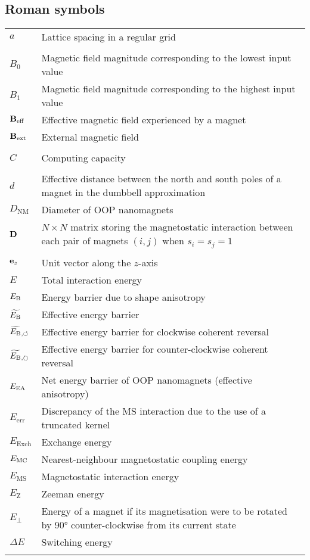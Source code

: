 \subsection*{Roman symbols}
\begin{longtable}[l]{p{60pt} p{350pt}}
	$a$ & Lattice spacing in a regular grid \\
	&\\

	$B_0$ & Magnetic field magnitude corresponding to the lowest input value \\
	$B_1$ & Magnetic field magnitude corresponding to the highest input value \\
	$\boldsymbol{\mathbf{B}}_\mathrm{eff}$ & Effective magnetic field experienced by a magnet \\
	$\boldsymbol{\mathbf{B}}_\mathrm{ext}$ & External magnetic field \\
	&\\
	
	$C$ & Computing capacity \\
	&\\

	$d$ & Effective distance between the north and south poles of a magnet in the dumbbell approximation \\
	$D_\mathrm{NM}$ & Diameter of OOP nanomagnets \\
	$\boldsymbol{\mathbf{D}}$ & $N \times N$ matrix storing the magnetostatic interaction between each pair of magnets $(i,j)$ when $s_i=s_j=1$ \\
	&\\

	$\boldsymbol{\mathbf{e}}_z$ & Unit vector along the $z$-axis \\
	$E$ & Total interaction energy \\
	$E_\mathrm{B}$ & Energy barrier due to shape anisotropy \\
	$\widetilde{E_\mathrm{B}}$ & Effective energy barrier \\
	$\widetilde{E_\mathrm{B}}{}_{,\circlearrowleft}$ & Effective energy barrier for clockwise coherent reversal \\
	$\widetilde{E_\mathrm{B}}{}_{,\circlearrowright}$ & Effective energy barrier for counter-clockwise coherent reversal \\
	$E_\mathrm{EA}$ & Net energy barrier of OOP nanomagnets (effective anisotropy) \\
	$E_\mathrm{err}$ & Discrepancy of the MS interaction due to the use of a truncated kernel \\
	$E_\mathrm{Exch}$ & Exchange energy\\
	$E_\mathrm{MC}$ & Nearest-neighbour magnetostatic coupling energy \\
	$E_\mathrm{MS}$ & Magnetostatic interaction energy \\
	$E_\mathrm{Z}$ & Zeeman energy\\
	$E_\perp$ & Energy of a magnet if its magnetisation were to be rotated by \ang{90} counter-clockwise from its current state \\
	$\Delta E$ & Switching energy \\
	&\\
	

\end{longtable}
